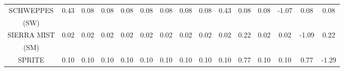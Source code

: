 \begin{tabular}{ccccccccccccccc}
SCHWEPPES                     &        0.43 &             0.08 &                           0.08 &                           0.08 &               0.08 &            0.08 &              0.08 &              0.08 &                      0.43 &                      0.08 &          0.08 &      -1.07 &         0.08 &    0.08 \\
 (SW) & \\
SIERRA MIST                   &        0.02 &             0.02 &                           0.02 &                           0.02 &               0.02 &            0.02 &              0.02 &              0.02 &                      0.02 &                      0.22 &          0.02 &       0.02 &        -1.09 &    0.22 \\
 (SM) & \\
SPRITE                        &        0.10 &             0.10 &                           0.10 &                           0.10 &               0.10 &            0.10 &              0.10 &              0.10 &                      0.10 &                      0.77 &          0.10 &       0.10 &         0.77 &   -1.29 \\
\bottomrule
\end{tabular}
